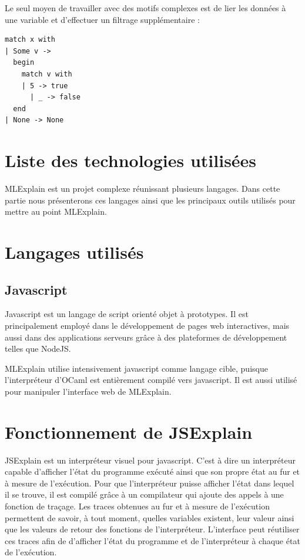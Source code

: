\documentclass{easychair}
\begin{document}
Le seul moyen de travailler avec des motifs complexes est de lier les données à 
une variable et d'effectuer un filtrage supplémentaire :

\begin{verbatim}
match x with
| Some v ->
  begin
    match v with
    | 5 -> true
      | _ -> false
  end
| None -> None
\end{verbatim}

\section{Liste des technologies utilisées}
MLExplain est un projet complexe réunissant plusieurs langages. Dans cette 
partie nous présenterons ces langages ainsi que les principaux outils utilisés 
pour mettre au point MLExplain.

\section{Langages utilisés}
\subsection{Javascript}
Javascript est un langage de script orienté objet à prototypes. Il est 
principalement employé dans le développement de pages web interactives, mais 
aussi dans des applications serveurs grâce à des plateformes de développement 
telles que NodeJS.

MLExplain utilise intensivement javascript comme langage cible, puisque 
l'interpréteur d'OCaml est entièrement compilé vers javascript. Il est aussi 
utilisé pour manipuler l'interface web de MLExplain.



\section{Fonctionnement de JSExplain}
JSExplain est un interpréteur visuel pour javascript. C'est à dire un 
interpréteur capable d'afficher l'état du programme exécuté ainsi que son 
propre état au fur et à mesure de l'exécution. Pour que l'interpréteur puisse 
afficher l'état dans lequel il se trouve, il est compilé grâce à un compilateur 
qui ajoute des appels à une fonction de traçage. Les traces obtenues au fur et 
à mesure de l'exécution permettent de savoir, à tout moment, quelles variables 
existent, leur valeur ainsi que les valeurs de retour des fonctions de 
l'interpréteur. L'interface peut réutiliser ces traces afin de d'afficher 
l'état du programme et de l'interpréteur à chaque état de l'exécution.
\end{document}
